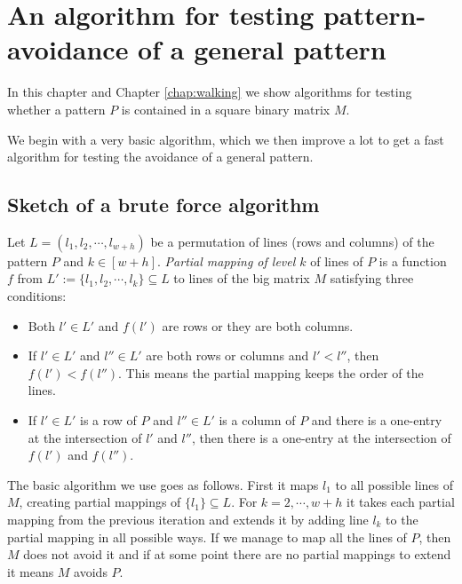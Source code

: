 \chapter{An algorithm for testing pattern-avoidance of a general pattern}
\label{chap:general}
In this chapter and Chapter \ref{chap:walking} we show algorithms for testing whether a pattern $P$ is contained in a square binary matrix $M$.

We begin with a very basic algorithm, which we then improve a lot to get a fast algorithm for testing the avoidance of a general pattern.

\section{Sketch of a brute force algorithm}
Let $L=(l_1,l_2,\cdots,l_{w+h})$ be a permutation of lines (rows and columns) of the pattern $P$ and $k\in[w+h]$. \emph{Partial mapping of level $k$} of lines of $P$ is a function $f$ from $L':=\{l_1,l_2,\cdots,l_k\}\subseteq L$ to lines of the big matrix $M$ satisfying three conditions: 
\begin{itemize}
\item Both $l'\in L'$ and $f(l')$ are rows or they are both columns.
\item If $l'\in L'$ and $l''\in L'$ are both rows or columns and $l'<l''$, then $f(l')<f(l'')$. This means the partial mapping keeps the order of the lines.
\item If $l'\in L'$ is a row of $P$ and $l''\in L'$ is a column of $P$ and there is a one-entry at the intersection of $l'$ and $l''$, then there is a one-entry at the intersection of $f(l')$ and $f(l'')$.
\end{itemize}
The basic algorithm we use goes as follows. First it maps $l_1$ to all possible lines of $M$, creating partial mappings of $\{l_1\}\subseteq L$. For $k=2,\cdots,w+h$ it takes each partial mapping from the previous iteration and extends it by adding line $l_k$ to the partial mapping in all possible ways. If we manage to map all the lines of $P$, then $M$ does not avoid it and if at some point there are no partial mappings to extend it means $M$ avoids $P$.

